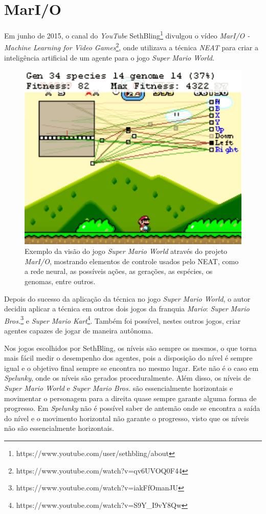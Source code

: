 \section{MarI/O}
Em junho de 2015, o canal do \textit{YouTube}
SethBling\footnote{https://www.youtube.com/user/sethbling/about} divulgou
o vídeo \textit{MarI/O - Machine Learning for Video
Games}\footnote{https://www.youtube.com/watch?v=qv6UVOQ0F44}, onde utilizava a
técnica \textit{NEAT} para criar a inteligência artificial de um agente para o
jogo \textit{Super Mario World}.

\begin{figure}[htb!]
\centering
\includegraphics[width=.65\textwidth]{fig/mar-io-example.pdf}
\caption{\label{fig:mar-io-example}Exemplo da visão do jogo \textit{Super
Mario World} através do projeto \textit{MarI/O}, mostrando elementos de
controle usados pelo NEAT, como a rede neural, as possíveis ações, as
gerações, as espécies, os genomas, entre outros.}
\end{figure}

Depois do sucesso da aplicação da técnica no jogo \textit{Super Mario World}, o
autor decidiu aplicar a técnica em outros dois jogos da franquia \textit{Mario}:
\textit{Super Mario Bros.}\footnote{https://www.youtube.com/watch?v=iakFfOmanJU}
e \textit{Super Mario
Kart}\footnote{https://www.youtube.com/watch?v=S9Y\_I9vY8Qw}. Também foi
possível, nestes outros jogos, criar agentes capazes de jogar de maneira
autônoma.

Nos jogos escolhidos por SethBling, os níveis são sempre os mesmos, o que torna
mais fácil medir o desempenho dos agentes, pois a disposição do nível é sempre
igual e o objetivo final sempre se encontra no mesmo lugar. Este não é o caso em
\textit{Spelunky}, onde os níveis são gerados proceduralmente. Além disso, os
níveis de \textit{Super Mario World} e \textit{Super Mario Bros.} são
essencialmente horizontais e movimentar o personagem para a direita quase sempre
garante alguma forma de progresso. Em \textit{Spelunky} não é possível saber de
antemão onde se encontra a saída do nível e o movimento horizontal não garante o
progresso, visto que os níveis não são essencialmente horizontais. 
